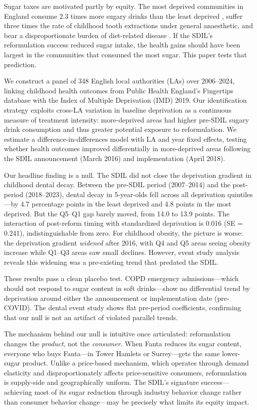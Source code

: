 \documentclass[12pt]{article}
\begin{document}
Sugar taxes are motivated partly by equity. The most deprived communities in England consume 2.3 times more sugary drinks than the least deprived \citep{ndep2020}, suffer three times the rate of childhood tooth extractions under general anaesthetic, and bear a disproportionate burden of diet-related disease \citep{marmot2020}. If the SDIL's reformulation success reduced sugar intake, the health gains should have been largest in the communities that consumed the most sugar. This paper tests that prediction.

We construct a panel of 348 English local authorities (LAs) over 2006--2024, linking childhood health outcomes from Public Health England's Fingertips database with the Index of Multiple Deprivation (IMD) 2019. Our identification strategy exploits cross-LA variation in baseline deprivation as a continuous measure of treatment intensity: more-deprived areas had higher pre-SDIL sugary drink consumption and thus greater potential exposure to reformulation. We estimate a difference-in-differences model with LA and year fixed effects, testing whether health outcomes improved differentially in more-deprived areas following the SDIL announcement (March 2016) and implementation (April 2018).

Our headline finding is a null. The SDIL did not close the deprivation gradient in childhood dental decay. Between the pre-SDIL period (2007--2014) and the post-period (2018--2023), dental decay in 5-year-olds fell across all deprivation quintiles---by 4.7 percentage points in the least deprived and 4.8 points in the most deprived. But the Q5--Q1 gap barely moved, from 14.0 to 13.9 points. The interaction of post-reform timing with standardized deprivation is 0.016 (SE = 0.241), indistinguishable from zero. For childhood obesity, the picture is worse: the deprivation gradient \textit{widened} after 2016, with Q4 and Q5 areas seeing obesity increase while Q1--Q3 areas saw small declines. However, event study analysis reveals this widening was a pre-existing trend that predated the SDIL.

These results pass a clean placebo test. COPD emergency admissions---which should not respond to sugar content in soft drinks---show no differential trend by deprivation around either the announcement or implementation date (pre-COVID). The dental event study shows flat pre-period coefficients, confirming that our null is not an artifact of violated parallel trends.

The mechanism behind our null is intuitive once articulated: reformulation changes the \textit{product}, not the \textit{consumer}. When Fanta reduces its sugar content, everyone who buys Fanta---in Tower Hamlets or Surrey---gets the same lower-sugar product. Unlike a price-based mechanism, which operates through demand elasticity and disproportionately affects price-sensitive consumers, reformulation is supply-side and geographically uniform. The SDIL's signature success---achieving most of its sugar reduction through industry behavior change rather than consumer behavior change---may be precisely what limits its equity impact.
\end{document}
